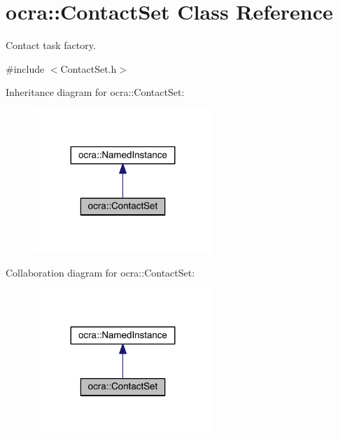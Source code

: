 \hypertarget{classocra_1_1ContactSet}{}\section{ocra\+:\+:Contact\+Set Class Reference}
\label{classocra_1_1ContactSet}


Contact task factory.  




{\ttfamily \#include $<$Contact\+Set.\+h$>$}



Inheritance diagram for ocra\+:\+:Contact\+Set\+:\nopagebreak
\begin{figure}[H]
\begin{center}
\leavevmode
\includegraphics[width=191pt]{d5/de0/classocra_1_1ContactSet__inherit__graph}
\end{center}
\end{figure}


Collaboration diagram for ocra\+:\+:Contact\+Set\+:\nopagebreak
\begin{figure}[H]
\begin{center}
\leavevmode
\includegraphics[width=191pt]{da/d52/classocra_1_1ContactSet__coll__graph}
\end{center}
\end{figure}
